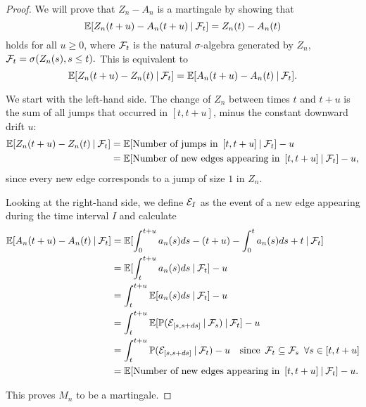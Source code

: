 \begin{proof} \label{P: decomp Zn}
	We will prove that $Z_n - A_n$ is a martingale by showing that
	\begin{equation} \label{E: Mn martingale}
	\mathbb{E}[ Z_n(t+u) - A_n(t+u) \: | \: \mathcal{F}_{t} ] = Z_n(t) - A_n(t)
	\end{equation}
	holds for all $u \geq 0$, where $\mathcal{F}_{t}$ is the natural $\sigma$-algebra generated by $Z_n$, 
	$\mathcal{F}_{t} = \sigma(Z_n(s), s \leq t).$
	This is equivalent to 
	\begin{equation}
	\mathbb{E}[Z_n(t+u) - Z_n(t) \: | \: \mathcal{F}_{t}] = \mathbb{E}[A_n(t+u) - A_n(t) \: | \: \mathcal{F}_{t}].
	\end{equation}
	
	We start with the left-hand side. 
	The change of $Z_n$ between times $t$ and $t+u$ is the sum of all jumps that occurred in $[t, t+u]$,
	minus the constant downward drift $u$:
	\begin{align*}
	\mathbb{E}[Z_n(t+u) - Z_n(t) \: | \: \mathcal{F}_{t}] 
	&= \mathbb{E}[\text{Number of jumps in} \enspace [t, t+u] \: | \: \mathcal{F}_{t}] - u \\
	&= \mathbb{E}[\text{Number of new edges appearing in} \enspace [t, t+u] \: | \: \mathcal{F}_{t}] - u,
	\end{align*}
	since every new edge corresponds to a jump of size $1$ in $Z_n$.
	
	Looking at the right-hand side, we define $\mathcal{E}_{I}$ as the event of a new edge appearing during the time interval $I$ and calculate
	\begin{align*}
	\mathbb{E}[A_n(t+u) - A_n(t) \: | \: \mathcal{F}_{t}]
	&= \mathbb{E}[ \int_{0}^{t+u} a_n(s)ds - (t+u) - \int_{0}^{t} a_n(s)ds + t \: | \: \mathcal{F}_{t} ] \\
	&= \mathbb{E}[ \int_{t}^{t+u} a_n(s)ds \: | \: \mathcal{F}_{t} ] - u \\
	&= \int_{t}^{t+u} \mathbb{E}[a_n(s)ds \: | \: \mathcal{F}_{t}] - u \\
	&= \int_{t}^{t+u} \mathbb{E}[ \mathbb{P}(\mathcal{E}_{[s, s+ds]} \: | \: \mathcal{F}_{s}) \: | \: \mathcal{F}_{t} ] - u\\
	&= \int_{t}^{t+u} \mathbb{P}( \mathcal{E}_{[s, s+ds]} \: | \: \mathcal{F}_{t} ) - u
	\quad \text{since} \enspace \mathcal{F}_{t} \subseteq \mathcal{F}_{s} \enspace \forall s \in [t,t+u] \\
	&= \mathbb{E}[\text{Number of new edges appearing in} \enspace [t, t+u] \: | \: \mathcal{F}_{t}] - u.
	\end{align*}
	
	This proves $M_n$ to be a martingale. 	
\end{proof}

